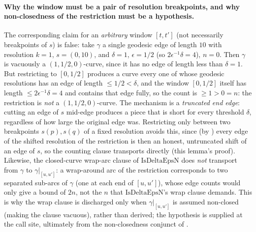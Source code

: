 \begin{lemma}
  \paragraph{Why the window must be a pair of resolution breakpoints, and why non-closedness of
  the restriction must be a hypothesis.} The corresponding claim for an \emph{arbitrary} window
  $[t,t']$ (not necessarily breakpoints of $s$) is false: take $\gamma$ a single geodesic edge of
  length $10$ with resolution $k=1$, $s=(0,10)$, and $\delta=1$, $\epsilon=1/2$ (so
  $2\epsilon^{-1}\delta=4$), $n=0$. Then $\gamma$ is vacuously a $(1,1/2,0)$-curve, since it has no
  edge of length less than $\delta=1$. But restricting to $[0,1/2]$ produces a curve every one of
  whose geodesic resolutions has an edge of length $\le 1/2 < \delta$, and the window $[0,1/2]$
  itself has length $\le 2\epsilon^{-1}\delta=4$ and contains that edge fully, so the count is
  $\ge 1 > 0 = n$: the restriction is \emph{not} a $(1,1/2,0)$-curve. The mechanism is a
  \emph{truncated end edge}: cutting an edge of $s$ mid-edge produces a piece that is short for
  every threshold $\delta$, regardless of how large the original edge was. Restricting only
  between two breakpoints $s(p),s(q)$ of a fixed resolution avoids this, since (by
  ) every edge of the shifted resolution of the restriction is
  then an honest, untruncated shift of an edge of $s$, so the counting clause transports directly
  (this lemma's proof). Likewise, the closed-curve wrap-arc clause of $\mathrm{IsDeltaEpsN}$ does
  \emph{not} transport from $\gamma$ to $\gamma|_{[u,u']}$: a wrap-around arc of the restriction
  corresponds to two separated sub-arcs of $\gamma$ (one at each end of $[u,u']$), whose edge
  counts would only give a bound of $2n$, not the $n$ that $\mathrm{IsDeltaEpsN}$'s wrap clause
  demands. This is why the wrap clause is discharged only when $\gamma|_{[u,u']}$ is assumed
  non-closed (making the clause vacuous), rather than derived; the hypothesis is supplied at the
  call site, ultimately from the non-closedness conjunct of .
\end{lemma}
